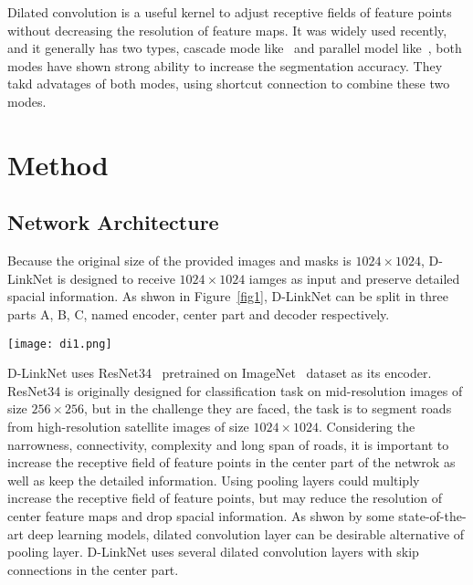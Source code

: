 \documentclass[10pt,twocolumn,letterpaper]{article}
\begin{document}
Dilated convolution is a useful kernel to adjust receptive fields of feature points without decreasing the resolution of feature maps. It was widely used recently, and it generally has two types, cascade mode like~\cite{21} and parallel model like~\cite{16}, both modes have shown strong ability to increase the segmentation accuracy. They takd advatages of both modes, using shortcut connection to combine these two modes. 

\section{Method}

\subsection{Network Architecture}

Because the original size of the provided images and masks is $1024\times 1024$, D-LinkNet is designed to receive $1024\times 1024$ iamges as input and preserve detailed spacial information. As shwon in Figure~\ref{fig1}, D-LinkNet can be split in three parts A, B, C, named encoder, center part and decoder respectively.

\begin{figure*}
\begin{center}
\texttt{[image: di1.png]}
\end{center}
\caption{ D-LinkNet architecture. Each blue rectangular block represents a multi-channel features map. Part A is the encoder of D-LinkNet. D-LinkNet uses ResNet34 as encoder. Part C is the decoder of D-LinkNet, it is set the same as LinkNet decoder. Original LinkNet only has Part A and Part C. D-LinkNet has an additional Part B which can enlarge the receptive field and as well as preserve the detailed spatial information. Each convolution layer is followed by a ReLU activation except the last convolution layer which use sigmoid activation.}
\label{fig1}
\end{figure*}

D-LinkNet uses ResNet34~\cite{10} pretrained on ImageNet~\cite{23} dataset as its encoder. ResNet34 is originally designed for classification task on mid-resolution images of size $256\times 256$, but in the challenge they are faced, the task is to segment roads from high-resolution satellite images of size $1024\times 1024$. Considering the narrowness, connectivity, complexity and long span of roads, it is important to increase the receptive field of feature  points in the center part of the netwrok as well as keep the detailed information. Using pooling layers could multiply increase the receptive field of feature points, but may reduce the resolution of center feature maps and drop spacial information. As shwon by some state-of-the-art deep learning models, dilated convolution layer can be desirable alternative of pooling layer. D-LinkNet uses several dilated convolution layers with skip connections in the center part.
\end{document}
